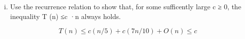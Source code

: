 \documentclass[11pt]{article}
\begin{document}
\begin{subparts}
\begin{enumerate}[i.]
        \item Use the recurrence relation to show that, for some sufficently large c ≥ 0, the
        inequality T (n) ≤c ·n always holds. \par
        \begin{solution}
            $$T(n)\leq c(n/5)+c(7n/10)+O(n) \leq c$$
        \end{solution}
    \end{enumerate}
\end{subparts}
\end{document}
